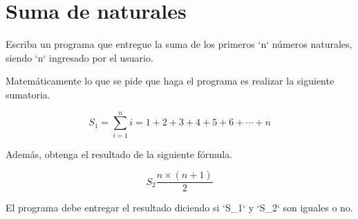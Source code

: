 \section{Suma de naturales}

Escriba un programa que entregue la suma de los primeros `n` números
naturales, siendo `n` ingresado por el usuario.

Matemáticamente lo que se pide que haga el programa es realizar la
siguiente sumatoria.

\[S_1 = \sum_{i=1}^{n} i = 1+2+3+4+5+6+\cdots+n\]

Además, obtenga el resultado de la siguiente fórmula.

\[S_2 \frac{n\times(n+1)}{2}\]

El programa debe entregar el resultado diciendo si `S\_1` y `S\_2` son
iguales o no.

